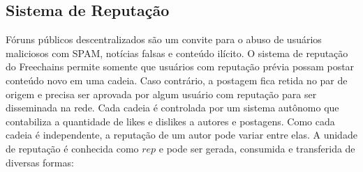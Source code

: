 \documentclass[12pt]{article}
\newcommand{\FC} {Freechains\xspace}
\begin{document}
\subsection{Sistema de Reputação}

Fóruns públicos descentralizados são um convite para o abuso de usuários
maliciosos com SPAM, notícias falsas e conteúdo ilícito.
O sistema de reputação do \FC permite somente que usuários com reputação prévia
possam postar conteúdo novo em uma cadeia.
Caso contrário, a postagem fica retida no par de origem e precisa ser aprovada
por algum usuário com reputação para ser disseminada na rede.
Cada cadeia é controlada por um sistema autônomo que contabiliza a quantidade
de likes e dislikes a autores e postagens.
Como cada cadeia é independente, a reputação de um autor pode variar entre
elas.
A unidade de reputação é conhecida como $rep$ e pode ser gerada, consumida e
transferida de diversas formas:
%
\end{document}
